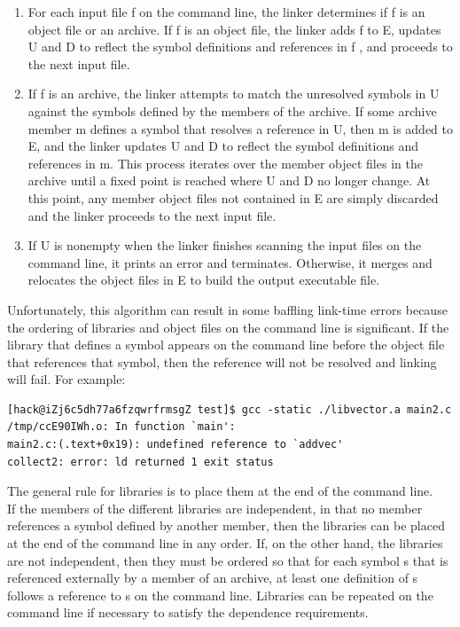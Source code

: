 \documentclass[11pt]{article}
\begin{document}
\begin{enumerate}
\item For each input file f on the command line, the linker determines if f is an object file or an archive. If f is an object file, the linker adds f to E, updates U and D to reflect the symbol definitions and references in f , and proceeds to the next input file.\\
\item If f is an archive, the linker attempts to match the unresolved symbols in U against the symbols defined by the members of the archive. If some archive member m defines a symbol that resolves a reference in U, then m is added to E, and the linker updates U and D to reflect the symbol definitions and references in m. This process iterates over the member object files in the archive until a fixed point is reached where U and D no longer change. At this point, any member object files not contained in E are simply discarded and the linker proceeds to the next input file.\\
\item If U is nonempty when the linker finishes scanning the input files on the command line, it prints an error and terminates. Otherwise, it merges and relocates the object files in E to build the output executable file.\\
\end{enumerate}


Unfortunately, this algorithm can result in some baffling link-time errors because the ordering of libraries and object files on the command line is significant. If the library that defines a symbol appears on the command line before the object file that references that symbol, then the reference will not be resolved and linking will fail. For example:\\
\begin{verbatim}
[hack@iZj6c5dh77a6fzqwrfrmsgZ test]$ gcc -static ./libvector.a main2.c
/tmp/ccE90IWh.o: In function `main':
main2.c:(.text+0x19): undefined reference to `addvec'
collect2: error: ld returned 1 exit status
\end{verbatim}

The general rule for libraries is to place them at the end of the command line.\\

If the members of the different libraries are independent, in that no member references a symbol defined by another member, then the libraries can be placed at the end of the command line in any order. If, on the other hand, the libraries are not independent, then they must be ordered so that for each symbol s that is referenced externally by a member of an archive, at least one definition of s follows a reference to s on the command line. Libraries can be repeated on the command line if necessary to satisfy the dependence requirements.\\
\end{document}
